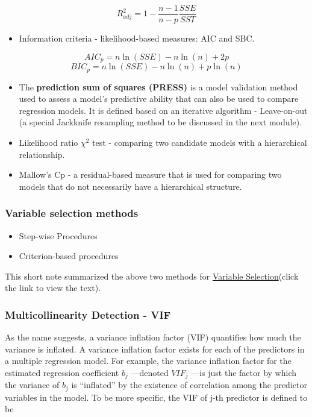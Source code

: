 \documentclass[
]{book}
\providecommand{\tightlist}{%
  \setlength{\itemsep}{0pt}\setlength{\parskip}{0pt}}
\begin{document}
\[
R^2_{adj} = 1 - \frac{n-1}{n-p} \frac{SSE}{SST}
\]

\begin{itemize}
\tightlist
\item
  Information criteria - likelihood-based measures: AIC and SBC.
\end{itemize}

\[
AIC_p = n \ln(SSE) - n\ln(n) + 2p
\]
\[
BIC_p = n\ln(SSE) - n\ln(n) + p\ln(n)
\]

\begin{itemize}
\item
  The \textbf{prediction sum of squares (PRESS)} is a model validation method used to assess a model's predictive ability that can also be used to compare regression models. It is defined based on an iterative algorithm - Leave-on-out (a special Jackknife resampling method to be discussed in the next module).
\item
  Likelihood ratio \(\chi^2\) test - comparing two candidate models with a hierarchical relationship.
\item
  Mallow's Cp - a residual-based measure that is used for comparing two models that do not necessarily have a hierarchical structure.
\end{itemize}

\hypertarget{variable-selection-methods}{%
\subsubsection{Variable selection methods}\label{variable-selection-methods}}

\begin{itemize}
\item
  Step-wise Procedures
\item
  Criterion-based procedures
\end{itemize}

This short note summarized the above two methods for \href{http://www.biostat.jhsph.edu/~iruczins/teaching/jf/ch10.pdf}{Variable Selection}(click the link to view the text).

\hypertarget{multicollinearity-detection---vif}{%
\subsubsection{Multicollinearity Detection - VIF}\label{multicollinearity-detection---vif}}

As the name suggests, a variance inflation factor (VIF) quantifies how much the variance is inflated. A variance inflation factor exists for each of the predictors in a multiple regression model. For example, the variance inflation factor for the estimated regression coefficient \(b_j\) ---denoted \(VIF_j\) ---is just the factor by which the variance of \(b_j\) is ``inflated'' by the existence of correlation among the predictor variables in the model. To be more specific, the VIF of j-th predictor is defined to be
\end{document}
